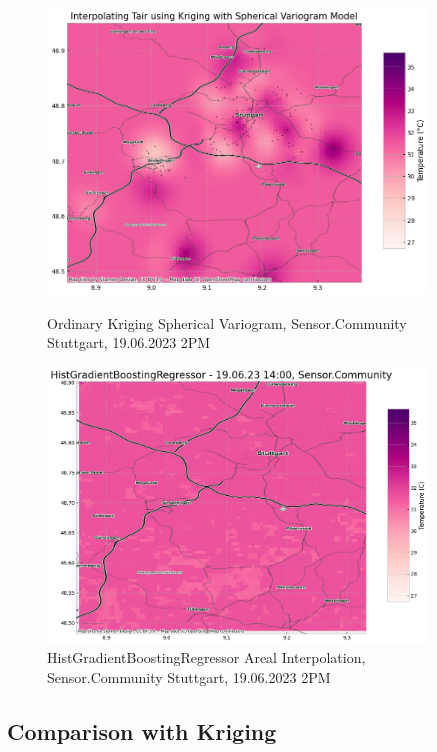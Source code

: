 \begin{figure}[htp]
    \centering
    \includegraphics[width=0.9\textwidth]{images/eval areal interpolation ok stuttgart 14h.png}
    \caption{Ordinary Kriging Spherical Variogram, Sensor.Community Stuttgart, 19.06.2023 2PM}
    \label{fig:eval areal interpolation ok 14h stuttgart}

    \includegraphics[width=0.9\textwidth]{images/eval areal interpolation hgb 14h.png}
    \caption{HistGradientBoostingRegressor Areal Interpolation, Sensor.Community Stuttgart, 19.06.2023 2PM}
    \label{fig:eval areal interpolation hgb 14h stuttgart}
\end{figure}

\subsection{Comparison with Kriging}

